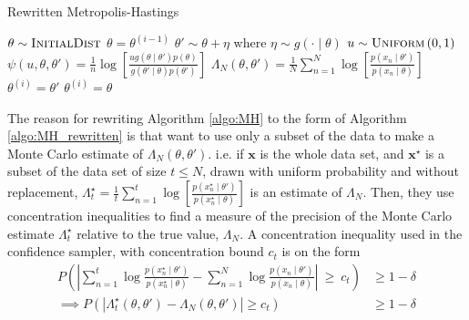 \begin{algorithm}[H] 
    \caption{Rewritten Metropolis-Hastings}
    \label{algo:MH_rewritten}
    \begin{algorithmic}[1] %
        \State $\theta \sim \textsc{InitialDist}$ 
        \State $\theta = \theta^{\left(i-1\right)}$ 
        \State$\theta' \sim \theta + \eta$ where $\eta\sim g\left(\cdot \mid \theta\right)$
        \State $u\sim \textsc{Uniform}\left(0,1\right)$
        \State $\psi\left(u, \theta, \theta'\right) = \frac{1}{n} \log\left[\frac{u g\left(\theta \mid \theta' \right) p \left(\theta\right)}{g\left(\theta' \mid \theta \right)p\left(\theta'\right)} \right]$
        \State $\Lambda_N \left(\theta, \theta'\right) = \frac{1}{N} \sum_{n = 1}^N \log \left[\frac{p\left(x_{n}\mid \theta'\right)}{p\left(x_{n}\mid \theta\right)}\right]$
        \State $\theta^{\left(i\right)} = \theta'$
        \Else 
        \State $\theta^{\left(i\right)} = \theta$
         \EndIf
         \EndFor
    \end{algorithmic}
\end{algorithm}
The reason for rewriting Algorithm \ref{algo:MH} to the form of Algorithm \ref{algo:MH_rewritten} is that \cite{Bardenet:2} want to use only a subset of the data to make a Monte Carlo estimate of $\Lambda_N\left(\theta, \theta'\right)$. 
i.e. if $\mathbf{x}$ is the whole data set, and $\mathbf{x}^{\star}$ is a subset of the data set of size $t\leq N$, drawn with uniform probability and without replacement, $\Lambda^{\star}_t = \frac{1}{t} \sum_{n = 1}^t \log\left[\frac{p\left(x_n^{\star}\mid \theta'\right)}{p\left(x_n^{\star}\mid \theta\right)}\right]$ is an estimate of $\Lambda_N$.  Then, they use concentration inequalities to find a measure of the precision of the Monte Carlo estimate $\Lambda_t^{\star}$ relative to the true value,  $\Lambda_N$.
A concentration inequality used in the confidence sampler, with concentration bound $c_t$ is on the form
\begin{equation}\label{eq:concentration}
\begin{split}
    P\left(\left| \sum_{n = 1}^t \log
    \frac{p\left(x_n^{\star}\mid \theta'\right)}{p\left(x_n^{\star}\mid
    \theta\right)} - \sum_{n = 1}^N \log \frac{p\left(x_n\mid\theta'\right)}{p\left(x_n\mid 
    \theta\right)}\right| \:\geq \:c_t\right) &\geq 1 - \delta \\ 
    \implies P\left(\left|\Lambda_t^{\star}\left(\theta, \theta'\right) - \Lambda_N\left(\theta,\theta'\right) \right| 
    \geq c_t \right) &\geq 1 - \delta
\end{split}
\end{equation}
